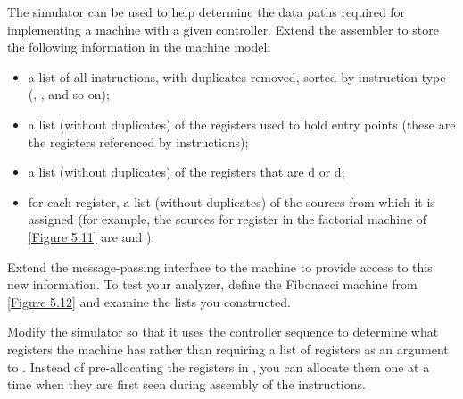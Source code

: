 \begin{exercise}
	\label{Exercise 5.12}
	The simulator can be used to help determine the data paths required for implementing a machine with a given controller.
	Extend the assembler to store the following information in the machine model:
	\begin{itemize}

		\item
			a list of all instructions, with duplicates removed, sorted by instruction type (, , and so on);

		\item
			a list (without duplicates) of the registers used to hold entry points (these are the registers referenced by  instructions);

		\item
			a list (without duplicates) of the registers that are d or d;

		\item
			for each register, a list (without duplicates) of the sources from which it is assigned (for example, the sources for register  in the factorial machine of \cref{Figure 5.11} are  and ).

	\end{itemize}
	Extend the message-passing interface to the machine to provide access to this new information.
	To test your analyzer, define the Fibonacci machine from \cref{Figure 5.12} and examine the lists you constructed.
\end{exercise}



\begin{exercise}
	\label{Exercise 5.13}
	Modify the simulator so that it uses the controller sequence to determine what registers the machine has rather than requiring a list of registers as an argument to .
	Instead of pre-allocating the registers in , you can allocate them one at a time when they are first seen during assembly of the instructions.
\end{exercise}
